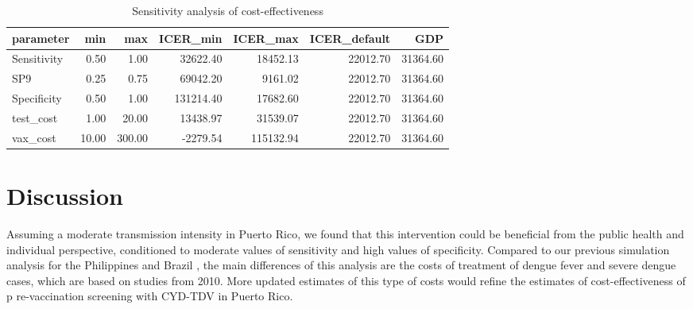 \documentclass[11pt]{article}
\begin{document}
\begin{table}[ht]
\centering
\begin{tabular}{lrrrrrr}
  \hline
parameter & min & max & ICER\_min & ICER\_max & ICER\_default & GDP \\ 
  \hline
Sensitivity & 0.50 & 1.00 & 32622.40 & 18452.13 & 22012.70 & 31364.60 \\ 
  SP9 & 0.25 & 0.75 & 69042.20 & 9161.02 & 22012.70 & 31364.60 \\ 
  Specificity & 0.50 & 1.00 & 131214.40 & 17682.60 & 22012.70 & 31364.60 \\ 
  test\_cost & 1.00 & 20.00 & 13438.97 & 31539.07 & 22012.70 & 31364.60 \\ 
  vax\_cost & 10.00 & 300.00 & -2279.54 & 115132.94 & 22012.70 & 31364.60 \\ 
   \hline
\end{tabular}
\caption{Sensitivity analysis of cost-effectiveness} 
\label{table-tornado}
\end{table}

\section{Discussion}
\label{sec:org4812a88}
Assuming a moderate transmission intensity in Puerto Rico, we found that this intervention could be beneficial from the public health and individual perspective, conditioned to moderate values of sensitivity and high values of specificity. Compared to our previous simulation analysis for the Philippines and Brazil \cite{Espana2019Biorxiv}, the main differences of this analysis are the costs of treatment of dengue fever and severe dengue cases, which are based on studies from 2010. More updated estimates of this type of costs would refine the estimates of cost-effectiveness of p re-vaccination screening with CYD-TDV in Puerto Rico. 


 
\end{document}
